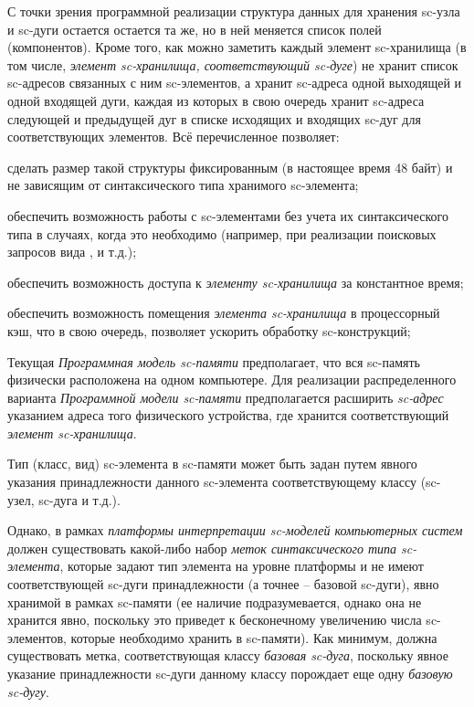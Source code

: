 С точки зрения программной реализации структура данных для хранения sc-узла и sc-дуги остается остается та же, но в
ней меняется список полей (компонентов).
Кроме того, как можно заметить каждый элемент sc-хранилища (в том числе, \textit{элемент sc-хранилища, соответствующий
sc-дуге}) не хранит список sc-адресов связанных с ним sc-элементов, а хранит sc-адреса одной выходящей и одной
входящей дуги, каждая из которых в свою очередь хранит sc-адреса следующей и предыдущей дуг в списке исходящих и
входящих sc-дуг для соответствующих элементов. Всё перечисленное позволяет:
\begin{scnitemize}
    \item сделать размер такой структуры фиксированным (в настоящее время 48 байт) и не зависящим от синтаксического
    типа хранимого sc-элемента;
    \item обеспечить возможность работы с sc-элементами без учета их синтаксического типа в случаях, когда это необходимо
    (например, при реализации поисковых запросов вида ,
     и т.д.);
    \item обеспечить возможность доступа к \textit{элементу sc-хранилища} за константное время;
    \item обеспечить возможность помещения \textit{элемента sc-хранилища} в процессорный кэш, что в свою очередь,
    позволяет ускорить обработку sc-конструкций;
\end{scnitemize}

Текущая \textit{Программная модель sc-памяти} предполагает, что вся sc-память физически расположена на одном компьютере.
Для реализации распределенного варианта \textit{Программной модели sc-памяти} предполагается расширить \textit{sc-адрес}
указанием адреса того физического устройства, где хранится соответствующий \textit{элемент sc-хранилища}.

Тип (класс, вид) sc-элемента в sc-памяти может быть задан путем явного указания принадлежности данного sc-элемента
соответствующему классу (sc-узел, sc-дуга и т.д.).

Однако, в рамках \textit{платформы интерпретации sc-моделей компьютерных систем} должен существовать какой-либо набор
\textit{меток синтаксического типа sc-элемента}, которые задают тип элемента на уровне платформы и не имеют соответствующей
sc-дуги принадлежности (а точнее -- базовой sc-дуги), явно хранимой в рамках sc-памяти (ее наличие подразумевается,
однако она не хранится явно, поскольку это приведет к бесконечному увеличению числа sc-элементов, которые необходимо
хранить в sc-памяти). Как минимум, должна существовать метка, соответствующая классу \textit{базовая sc-дуга}, поскольку
явное указание принадлежности sc-дуги данному классу порождает еще одну \textit{базовую sc-дугу}.

